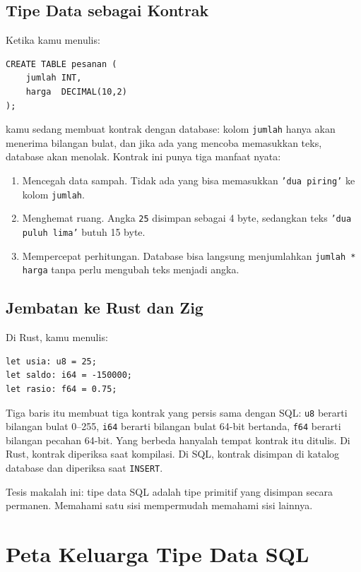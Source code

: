 \documentclass[11pt,a4paper]{article}
\begin{document}
\subsection{Tipe Data sebagai Kontrak}

Ketika kamu menulis:

\begin{lstlisting}[style=code]
CREATE TABLE pesanan (
    jumlah INT,
    harga  DECIMAL(10,2)
);
\end{lstlisting}

kamu sedang membuat kontrak dengan database: kolom \texttt{jumlah} hanya akan menerima bilangan bulat, dan jika ada yang mencoba memasukkan teks, database akan menolak. Kontrak ini punya tiga manfaat nyata:

\begin{enumerate}
	\item Mencegah data sampah. Tidak ada yang bisa memasukkan \texttt{'dua piring'} ke kolom \texttt{jumlah}.
	\item Menghemat ruang. Angka \texttt{25} disimpan sebagai 4 byte, sedangkan teks \texttt{'dua puluh lima'} butuh 15 byte.
	\item Mempercepat perhitungan. Database bisa langsung menjumlahkan \texttt{jumlah * harga} tanpa perlu mengubah teks menjadi angka.
\end{enumerate}

\subsection{Jembatan ke Rust dan Zig}

Di Rust, kamu menulis:

\begin{lstlisting}[style=code]
let usia: u8 = 25;
let saldo: i64 = -150000;
let rasio: f64 = 0.75;
\end{lstlisting}

Tiga baris itu membuat tiga kontrak yang persis sama dengan SQL: \texttt{u8} berarti bilangan bulat 0--255, \texttt{i64} berarti bilangan bulat 64-bit bertanda, \texttt{f64} berarti bilangan pecahan 64-bit. Yang berbeda hanyalah tempat kontrak itu ditulis. Di Rust, kontrak diperiksa saat kompilasi. Di SQL, kontrak disimpan di katalog database dan diperiksa saat \texttt{INSERT}.

Tesis makalah ini: tipe data SQL adalah tipe primitif yang disimpan secara permanen. Memahami satu sisi mempermudah memahami sisi lainnya.

\section{Peta Keluarga Tipe Data SQL}
\end{document}
